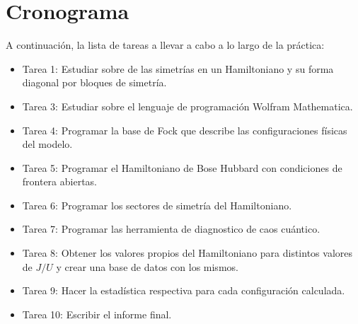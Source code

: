 \documentclass[spanish,titlepage,table]{practicas}
\begin{document}
\section{Cronograma}
A continuación, la lista de tareas a llevar a cabo a lo largo de la práctica:
\begin{itemize}
    \item Tarea 1: Estudiar sobre de las simetrías en un Hamiltoniano y su forma diagonal por bloques de simetría.
    \item Tarea 3: Estudiar sobre el lenguaje de programación Wolfram Mathematica.
    \item Tarea 4: Programar la base de Fock que describe las configuraciones físicas del modelo.
    \item Tarea 5: Programar el Hamiltoniano de Bose Hubbard con condiciones de frontera abiertas.
    \item Tarea 6: Programar los sectores de simetría del Hamiltoniano.
    \item Tarea 7: Programar las herramienta de diagnostico de caos cuántico. 
    \item Tarea 8: Obtener los valores propios del Hamiltoniano para distintos valores de $J/U$ y crear una base de datos con los mismos.
    \item Tarea 9: Hacer la estadística respectiva para cada configuración calculada.
    \item Tarea 10: Escribir el informe final.
\end{itemize}



\end{document}
